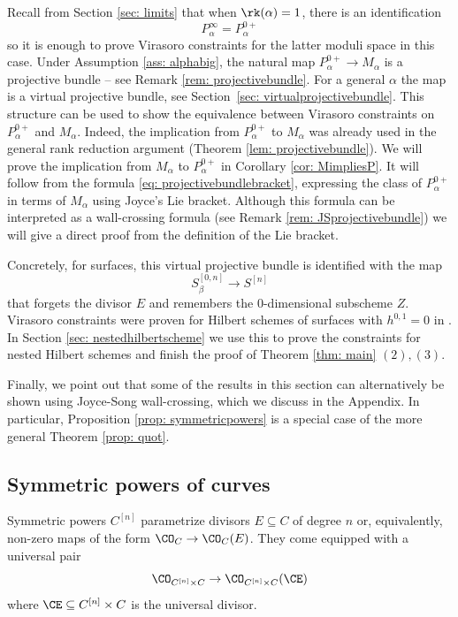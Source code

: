 Recall from Section \ref{sec: limits} that when $\rk(\alpha)=1$, there is an identification $$P_\alpha^\infty=P_\alpha^{0+}$$
so it is enough to prove Virasoro constraints for the latter moduli space in this case. Under Assumption \ref{ass: alphabig}, the natural map $P_{\alpha}^{0+}\to M_{\alpha}$ is a projective bundle -- see Remark \ref{rem: projectivebundle}. For a general $\alpha$ the map is a virtual projective bundle, see Section~\ref{sec: virtualprojectivebundle}. This structure can be used to show the equivalence between Virasoro constraints on $P_\alpha^{0+}$ and $M_\alpha$. Indeed, the implication from $P_\alpha^{0+}$ to $M_\alpha$ was already used in the general rank reduction argument (Theorem \ref{lem: projectivebundle}). We will prove the implication from $M_\alpha$ to $P_{\alpha}^{0+}$ in Corollary \ref{cor: MimpliesP}. It will follow from the formula \eqref{eq: projectivebundlebracket}, expressing the class of $P_{\alpha}^{0+}$ in terms of $M_\alpha$ using Joyce's Lie bracket. Although this formula can be interpreted as a wall-crossing formula (see Remark \ref{rem: JSprojectivebundle}) we will give a direct proof from the definition of the Lie bracket.

Concretely, for surfaces, this virtual projective bundle is identified with the map
\[S_\beta^{[0,n]}\to S^{[n]}\]
that forgets the divisor $E$ and remembers the $0$-dimensional subscheme $Z$. Virasoro constraints were proven for Hilbert schemes of surfaces with $h^{0,1}=0$ in \cite{moreira,moop}. In Section \ref{sec: nestedhilbertscheme} we use this to prove the constraints for nested Hilbert schemes and finish the proof of Theorem \ref{thm: main} $(2),(3)$.

Finally, we point out that some of the results in this section can alternatively be shown using Joyce-Song wall-crossing, which we discuss in the Appendix. In particular, Proposition \ref{prop: symmetricpowers} is a special case of the more general Theorem \ref{prop: quot}.


\subsection{Symmetric powers of curves}
\label{sec: symmetricpowers}
Symmetric powers $C^{[n]}$ parametrize divisors $E\subseteq C$ of degree $n$ or, equivalently, non-zero maps of the form $\CO_C\to \CO_C(E)$. They come equipped with a universal pair
\[\CO_{C^{[n]}\times C}\to \CO_{C^{[n]}\times C}( \CE)\]
where $\CE\subseteq C^{[n]}\times C$ is the universal divisor.

